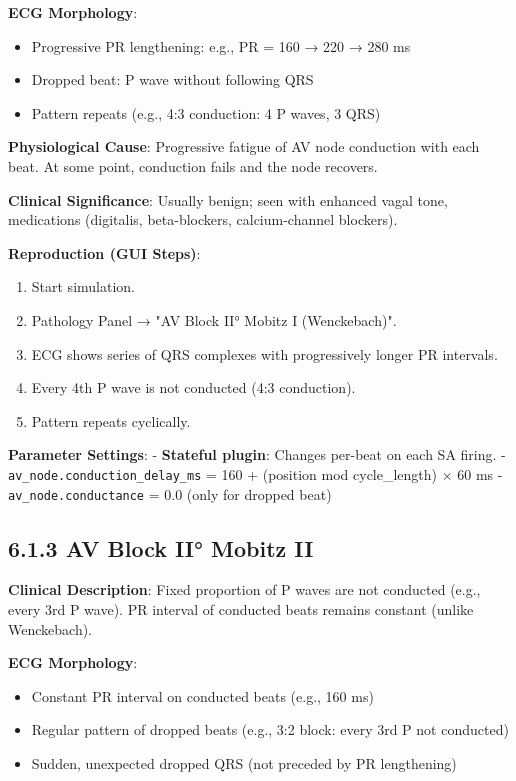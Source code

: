 \documentclass[12pt,oneside,a4paper]{book}
\newcommand{\code}[1]{\texttt{#1}}
\begin{document}
\textbf{ECG Morphology}:
\begin{itemize}
  \item Progressive PR lengthening: e.g., PR = 160 → 220 → 280 ms
  \item Dropped beat: P wave without following QRS
  \item Pattern repeats (e.g., 4:3 conduction: 4 P waves, 3 QRS)
\end{itemize}

\textbf{Physiological Cause}:
Progressive fatigue of AV node conduction with each beat. At some point, conduction fails and the node recovers.

\textbf{Clinical Significance}:
Usually benign; seen with enhanced vagal tone, medications (digitalis, beta-blockers, calcium-channel blockers).

\textbf{Reproduction (GUI Steps)}:
\begin{enumerate}
  \item Start simulation.
  \item Pathology Panel → "AV Block II° Mobitz I (Wenckebach)".
  \item ECG shows series of QRS complexes with progressively longer PR intervals.
  \item Every 4th P wave is not conducted (4:3 conduction).
  \item Pattern repeats cyclically.
\end{enumerate}

\textbf{Parameter Settings}:
- \textbf{Stateful plugin}: Changes per-beat on each SA firing.
- \code{av\_node.conduction\_delay\_ms} = 160 + (position mod cycle\_length) × 60 ms
- \code{av\_node.conductance} = 0.0 (only for dropped beat)

\subsection{6.1.3 AV Block II° Mobitz II}

\textbf{Clinical Description}:
Fixed proportion of P waves are not conducted (e.g., every 3rd P wave). PR interval of conducted beats remains constant (unlike Wenckebach).

\textbf{ECG Morphology}:
\begin{itemize}
  \item Constant PR interval on conducted beats (e.g., 160 ms)
  \item Regular pattern of dropped beats (e.g., 3:2 block: every 3rd P not conducted)
  \item Sudden, unexpected dropped QRS (not preceded by PR lengthening)
\end{itemize}
\end{document}
